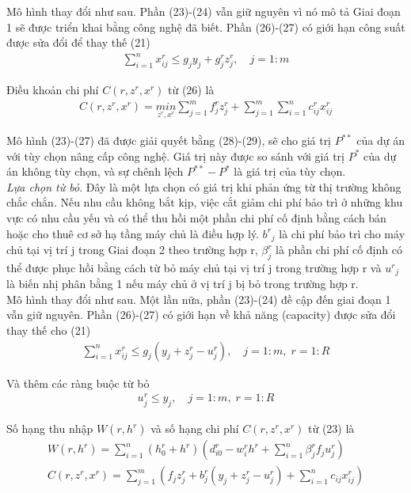 \documentclass[a4paper]{article}
\begin{document}
\begin{itemize}
        Mô hình thay đổi như sau. Phần (23)-(24) vẫn giữ nguyên vì nó mô tả Giai đoạn 1 sẽ được triển khai bằng công nghệ đã biết. 
        Phần (26)-(27) có giới hạn công suất được sửa đổi để thay thế (21)
        \begin{gather}
            \sum_{i=1}^{n}x_{ij}^r \leq g_jy_j + g_j^rz_j^r, \quad j=1:m
        \end{gather}

        Điều khoản chi phí $C(r,z^r,x^r)$ từ (26) là
        \begin{gather}
            C(r,z^r,x^r) = \underset{z^r,x^r}{min}\sum_{j=1}^{m}f_j^rz_j^r + \sum_{j=1}^{m}\sum_{i=1}^{n}c_{ij}^rx^r_{ij}
        \end{gather}

        Mô hình (23)-(27) đã được giải quyết bằng (28)-(29), sẽ cho giá trị $P^{**}$ của dự án với tùy chọn nâng cấp công nghệ. 
        Giá trị này được so sánh với giá trị $P^*$ của dự án không tùy chọn, và sự chênh lệch $P^{**} - P^*$ là giá trị của tùy chọn.
        \\

        \textit{Lựa chọn từ bỏ}. Đây là một lựa chọn có giá trị khi phản ứng từ thị trường không chắc chắn.
        Nếu nhu cầu không bắt kịp, việc cắt giảm chi phí bảo trì ở những khu vực có nhu cầu yếu và có thể thu hồi một phần chi phí cố định bằng cách bán hoặc cho thuê cơ sở hạ tầng máy chủ là điều hợp lý. 
        ${b^r}_j$ là chi phí bảo trì cho máy chủ tại vị trí j trong Giai đoạn 2 theo trường hợp r,
        $\beta_j^r$ là phần chi phí cố định có thể được phục hồi bằng cách từ bỏ máy chủ tại vị trí j trong trường hợp r và 
        ${u^r}_j$ là biến nhị phân bằng 1 nếu máy chủ ở vị trí j bị bỏ trong trường hợp r.
        \\

        Mô hình thay đổi như sau. Một lần nữa, phần (23)-(24) đề cập đến giai đoạn 1 vẫn giữ nguyên. 
        Phần (26)-(27) có giới hạn về khả năng (capacity) được sửa đổi thay thế cho (21)
        \begin{gather}
            \sum_{i=1}^{n}x_{ij}^r \leq g_j(y_j+z_j^r-u_j^r), \quad j=1:m, \; r=1:R
        \end{gather}

        Và thêm các ràng buộc từ bỏ 
        \begin{gather}
            u_j^r \leq y_j, \quad j=1:m, \; r=1:R
        \end{gather}

        Số hạng thu nhập $W(r,h^r)$ và số hạng chi phí $C(r,z^r,x^r)$ từ (23) là
        \begin{gather}
            W(r,h^r) = \sum_{i=1}^{n}(h_0^r+h^r)(d_{i0}^r-w_i^rh^r+\sum_{i=1}^{n}\beta_j^rf_ju_j^r)\\
            C(r,z^r,x^r) = \sum_{j=1}^{m}(f_jz_j^r+b_j^r(y_j+z_j^r-u_j^r)+\sum_{i=1}^{n}c_{ij}x_{ij}^r)
        \end{gather}


\end{itemize}
\end{document}
